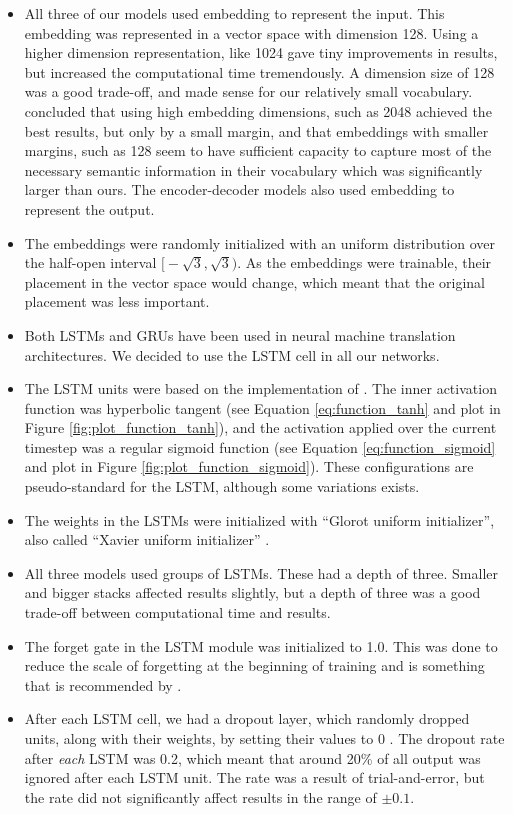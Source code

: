 \begin{itemize}
    \item All three of our models used embedding to represent the input. This embedding was represented in a vector space with dimension 128. Using a higher dimension representation, like 1024 gave tiny improvements in results, but increased the computational time tremendously. A dimension size of 128 was a good trade-off, and made sense for our relatively small vocabulary. \cite{britz2017massive} concluded that using high embedding dimensions, such as 2048 achieved the best results, but only by a small margin, and that embeddings with smaller margins, such as 128 seem to have sufficient capacity to capture most of the necessary semantic information in their vocabulary which was significantly larger than ours. The encoder-decoder models also used embedding to represent the output.
    \item The embeddings were randomly initialized with an uniform distribution over the half-open interval \(\big[-\sqrt{3}, \sqrt{3}\big)\). As the embeddings were trainable, their placement in the vector space would change, which meant that the original placement was less important.
    \item Both LSTMs and GRUs have been used in neural machine translation architectures. We decided to use the LSTM cell in all our networks. 
    \item The LSTM units were based on the implementation of \cite{hochreiter1997long}. The inner activation function was hyperbolic tangent (see Equation \ref{eq:function_tanh} and plot in Figure \ref{fig:plot_function_tanh}), and the activation applied over the current timestep was a regular sigmoid function (see Equation \ref{eq:function_sigmoid} and plot in Figure \ref{fig:plot_function_sigmoid}). These configurations are pseudo-standard for the LSTM, although some variations exists.
    \item The weights in the LSTMs were initialized with ``Glorot uniform initializer'', also called ``Xavier uniform initializer'' \citep{glorot2010understanding}.
    \item All three models used groups of LSTMs. These had a depth of three. Smaller and bigger stacks affected results slightly, but a depth of three was a good trade-off between computational time and results.
    \item The forget gate in the LSTM module was initialized to 1.0. This was done to reduce the scale of forgetting at the beginning of training and is something that is recommended by \cite{zaremba2015empirical}.
    \item After each LSTM cell, we had a dropout layer, which randomly dropped units, along with their weights, by setting their values to 0 \citep{srivastava2014dropout}. The dropout rate after \emph{each} LSTM was 0.2, which meant that around 20\% of all output was ignored after each LSTM unit. The rate was a result of trial-and-error, but the rate did not significantly affect results in the range of \(\pm 0.1\).
\end{itemize}

